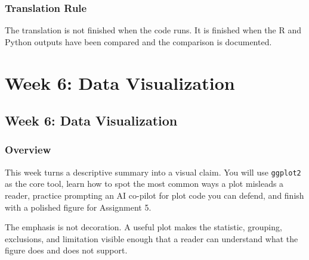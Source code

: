 \documentclass[
  letterpaper,
  DIV=11,
  numbers=noendperiod,
  oneside]{scrreprt}
\begin{document}
\section{Translation Rule}\label{translation-rule}

The translation is not finished when the code runs. It is finished when
the R and Python outputs have been compared and the comparison is
documented.

\part{Week 6: Data Visualization}

\chapter*{Week 6: Data Visualization}\label{week-6-data-visualization-1}


\section*{Overview}\label{overview-5}


This week turns a descriptive summary into a visual claim. You will use
\texttt{ggplot2} as the core tool, learn how to spot the most common
ways a plot misleads a reader, practice prompting an AI co-pilot for
plot code you can defend, and finish with a polished figure for
Assignment 5.

The emphasis is not decoration. A useful plot makes the statistic,
grouping, exclusions, and limitation visible enough that a reader can
understand what the figure does and does not support.
\end{document}
